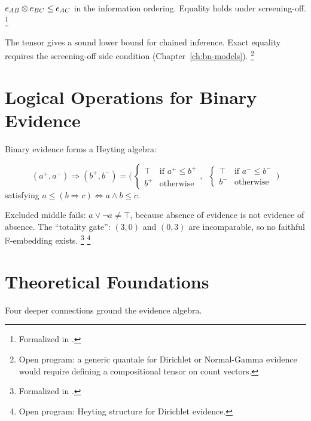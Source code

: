 \documentclass[11pt,openany]{report}
\begin{document}
\begin{theorem}
\label{thm:quantale-trans}
$e_{AB} \otimes e_{BC} \le e_{AC}$ in the information ordering.
Equality holds under screening-off.%
\footnote{Formalized in
.}
\end{theorem}

\noindent
The tensor gives a sound lower bound for chained inference.  Exact
equality requires the screening-off side condition
(Chapter~\ref{ch:bn-models}).%
\footnote{Open program: a generic quantale for Dirichlet or
Normal-Gamma evidence would require defining a compositional tensor
on count vectors.}


\section{Logical Operations for Binary Evidence}
\label{sec:binary-heyting}

Binary evidence forms a Heyting algebra:

\begin{definition}
\[
  (a^+, a^-) \Rightarrow (b^+, b^-) =
  \Big(\,\begin{cases} \top & \text{if } a^+ \le b^+ \\
                        b^+ & \text{otherwise}\end{cases},\;\;
        \begin{cases} \top & \text{if } a^- \le b^- \\
                        b^- & \text{otherwise}\end{cases}\,\Big)
\]
satisfying $a \le (b \Rightarrow c) \iff a \wedge b \le c$.
\end{definition}

\noindent
Excluded middle fails: $a \vee \neg a \ne \top$, because absence of
evidence is not evidence of absence.  The ``totality gate'':
$(3,0)$ and $(0,3)$ are incomparable, so no faithful
$\mathbb{R}$-embedding exists.%
\footnote{Formalized in
.}%
\footnote{Open program: Heyting structure for Dirichlet evidence.}


\section{Theoretical Foundations}

Four deeper connections ground the evidence algebra.
\end{document}
